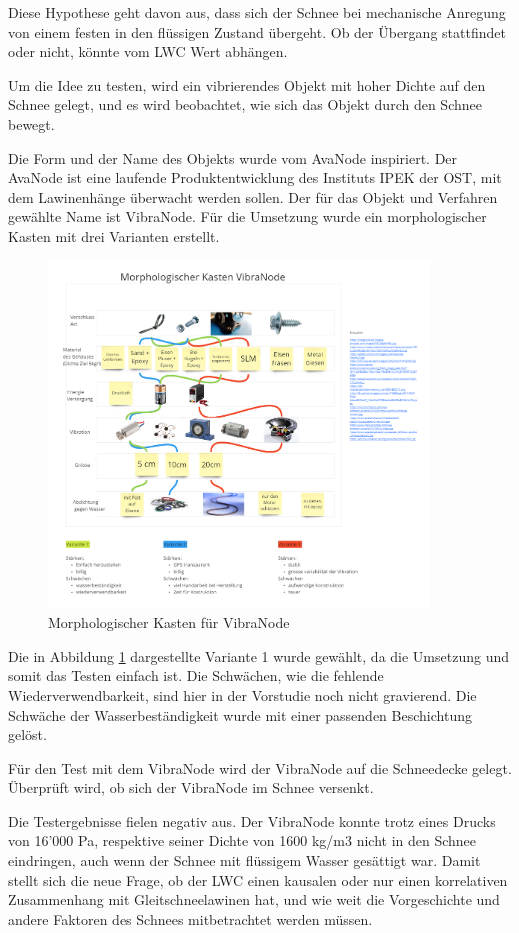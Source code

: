 
Diese Hypothese geht davon aus, dass sich der Schnee bei mechanische Anregung von einem festen in den flüssigen Zustand übergeht. Ob der Übergang stattfindet oder nicht, könnte vom LWC Wert abhängen.

Um die Idee zu testen, wird ein vibrierendes Objekt mit hoher Dichte auf den Schnee gelegt, und es wird beobachtet, wie sich das Objekt durch den Schnee bewegt.

Die Form und der Name des Objekts wurde vom  AvaNode inspiriert. Der AvaNode ist eine laufende Produktentwicklung des Instituts IPEK der OST, mit dem Lawinenhänge überwacht werden sollen. Der für das Objekt und Verfahren gewählte Name ist VibraNode. Für die Umsetzung wurde ein morphologischer Kasten mit drei Varianten erstellt.


\begin{figure}[H]
    \centering
    \includegraphics[width=0.9\textwidth]{Bilder/Unbenann2t.PNG}
    \caption{Morphologischer Kasten für VibraNode}
    \label{fig:MorphKasten}
\end{figure}




Die in Abbildung \ref{fig:MorphKasten} dargestellte Variante 1 wurde gewählt, da die Umsetzung und somit das Testen einfach ist. Die Schwächen, wie die fehlende Wiederverwendbarkeit, sind hier in der Vorstudie noch nicht gravierend. Die Schwäche der Wasserbeständigkeit wurde mit einer passenden Beschichtung gelöst.

Für den Test mit dem VibraNode wird der VibraNode auf die Schneedecke gelegt. Überprüft wird, ob sich der VibraNode im Schnee versenkt.

Die Testergebnisse fielen negativ aus. Der VibraNode konnte trotz eines Drucks von 16'000 Pa, respektive seiner Dichte von 1600 kg/m3 nicht in den Schnee eindringen, auch wenn der Schnee mit flüssigem Wasser gesättigt war. Damit  stellt sich die neue Frage, ob der LWC einen kausalen oder nur einen korrelativen Zusammenhang mit Gleitschneelawinen hat, und wie weit die Vorgeschichte und andere Faktoren des Schnees mitbetrachtet werden müssen. \cite{Altman.2015}
